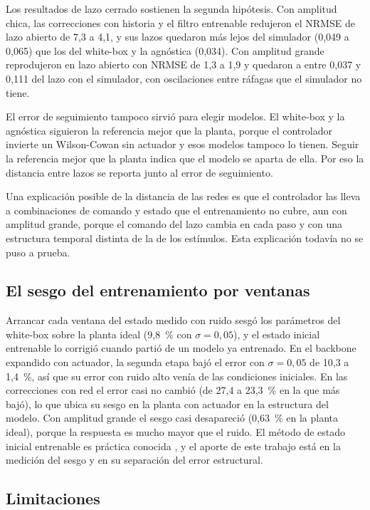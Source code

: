 \documentclass[11pt,a4paper]{article}
\begin{document}
Los resultados de lazo cerrado sostienen la segunda hipótesis. Con amplitud chica, las correcciones con historia y el filtro entrenable redujeron el NRMSE de lazo abierto de 7,3 a 4,1, y sus lazos quedaron más lejos del simulador (0,049 a 0,065) que los del white-box y la agnóstica (0,034). Con amplitud grande reprodujeron en lazo abierto con NRMSE de 1,3 a 1,9 y quedaron a entre 0,037 y 0,111 del lazo con el simulador, con oscilaciones entre ráfagas que el simulador no tiene.

El error de seguimiento tampoco sirvió para elegir modelos. El white-box y la agnóstica siguieron la referencia mejor que la planta, porque el controlador invierte un Wilson-Cowan sin actuador y esos modelos tampoco lo tienen. Seguir la referencia mejor que la planta indica que el modelo se aparta de ella. Por eso la distancia entre lazos se reporta junto al error de seguimiento.

Una explicación posible de la distancia de las redes es que el controlador las lleva a combinaciones de comando y estado que el entrenamiento no cubre, aun con amplitud grande, porque el comando del lazo cambia en cada paso y con una estructura temporal distinta de la de los estímulos. Esta explicación todavía no se puso a prueba.

\subsection{El sesgo del entrenamiento por ventanas}

Arrancar cada ventana del estado medido con ruido sesgó los parámetros del white-box sobre la planta ideal (9,8~\% con $\sigma = 0{,}05$), y el estado inicial entrenable lo corrigió cuando partió de un modelo ya entrenado. En el backbone expandido con actuador, la segunda etapa bajó el error con $\sigma = 0{,}05$ de 10,3 a 1,4~\%, así que su error con ruido alto venía de las condiciones iniciales. En las correcciones con red el error casi no cambió (de 27,4 a 23,3~\% en la que más bajó), lo que ubica su sesgo en la planta con actuador en la estructura del modelo. Con amplitud grande el sesgo casi desapareció (0,63~\% en la planta ideal), porque la respuesta es mucho mayor que el ruido. El método de estado inicial entrenable es práctica conocida \cite{turan2022,giampiccolo2024}, y el aporte de este trabajo está en la medición del sesgo y en su separación del error estructural.

\subsection{Limitaciones}
\end{document}

